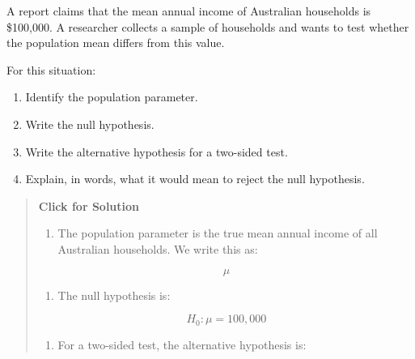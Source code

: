 \documentclass[
  letterpaper,
  DIV=11,
  numbers=noendperiod]{scrreprt}
\providecommand{\tightlist}{%
  \setlength{\itemsep}{0pt}\setlength{\parskip}{0pt}}
\begin{document}
\begin{tcolorbox}[enhanced jigsaw, arc=.35mm, bottomrule=.15mm, bottomtitle=1mm, breakable, colback=white, colbacktitle=quarto-callout-note-color!10!white, colframe=quarto-callout-note-color-frame, coltitle=black, left=2mm, leftrule=.75mm, opacityback=0, opacitybacktitle=0.6, rightrule=.15mm, title=\textcolor{quarto-callout-note-color}{\faInfo}\hspace{0.5em}{Question 1}, titlerule=0mm, toprule=.15mm, toptitle=1mm]

A report claims that the mean annual income of Australian households is
\$100,000. A researcher collects a sample of households and wants to
test whether the population mean differs from this value.

For this situation:

\begin{enumerate}
\def\labelenumi{\alph{enumi}.}
\tightlist
\item
  Identify the population parameter.\\
\item
  Write the null hypothesis.\\
\item
  Write the alternative hypothesis for a two-sided test.\\
\item
  Explain, in words, what it would mean to reject the null hypothesis.
\end{enumerate}

\begin{quote}
\textbf{Click for Solution}

\begin{enumerate}
\def\labelenumi{\alph{enumi}.}
\tightlist
\item
  The population parameter is the true mean annual income of all
  Australian households. We write this as:
\end{enumerate}

\[
\mu
\]

\begin{enumerate}
\def\labelenumi{\alph{enumi}.}
\setcounter{enumi}{1}
\tightlist
\item
  The null hypothesis is:
\end{enumerate}

\[
H_0: \mu = 100{,}000
\]

\begin{enumerate}
\def\labelenumi{\alph{enumi}.}
\setcounter{enumi}{2}
\tightlist
\item
  For a two-sided test, the alternative hypothesis is:
\end{enumerate}


\end{quote}
\end{tcolorbox}
\end{document}
